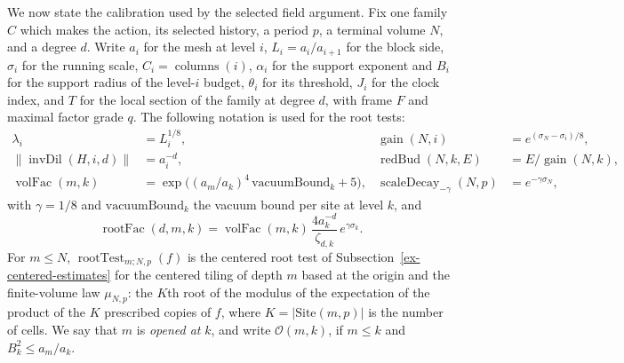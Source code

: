 We now state the calibration used by the selected field argument. Fix one
family $C$ which makes the action, its selected history, a period $p$, a
terminal volume $N$, and a degree $d$. Write $a_i$ for the mesh at level
$i$, $L_i=a_i/a_{i+1}$ for the block side, $\sigma_i$ for the running
scale, $C_i=\operatorname{columns}(i)$, $\alpha_i$ for the support
exponent and $B_i$ for the support radius of the level-$i$ budget,
$\theta_i$ for its threshold, $J_i$ for the clock index, and $T$ for the
local section of the family at degree $d$, with frame $F$ and maximal
factor grade $q$. The following notation is used for the root tests:
\begin{align*}
 \lambda_i&=L_i^{1/8},&
 \operatorname{gain}(N,i)&=e^{(\sigma_N-\sigma_i)/8},\\
 \|\operatorname{invDil}(H,i,d)\|&=a_i^{-d},&
 \operatorname{redBud}(N,k,E)&=E/\operatorname{gain}(N,k),\\
 \operatorname{volFac}(m,k)&=
   \exp\bigl((a_m/a_k)^4\,\mathrm{vacuumBound}_k+5\bigr),&
 \operatorname{scaleDecay}_{-\gamma}(N,p)&=e^{-\gamma\sigma_N},
\end{align*}
with $\gamma=1/8$ and $\mathrm{vacuumBound}_k$ the vacuum bound per site
at level $k$, and
\[
 \operatorname{rootFac}(d,m,k)=\operatorname{volFac}(m,k)\,
     \frac{4a_k^{-d}}{\zeta_{d,k}}\,e^{\gamma\sigma_k}.
\]
For $m\leq N$, $\operatorname{rootTest}_{m;N,p}(f)$ is the centered root
test of Subsection~\ref{ex-centered-estimates} for the centered tiling of
depth $m$ based at the origin and the finite-volume law $\mu_{N,p}$: the
$K$th root of the modulus of the expectation of the product of the $K$
prescribed copies of $f$, where $K=|\mathrm{Site}(m,p)|$ is the number of
cells. We say that $m$ is \emph{opened at} $k$, and write
$\mathcal O(m,k)$, if $m\leq k$ and $B_k^2\leq a_m/a_k$.

